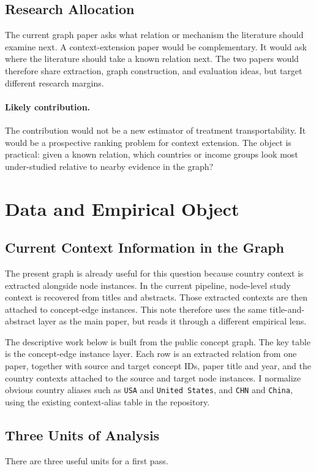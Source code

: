 \documentclass[11pt]{article}
\begin{document}
\subsection{Research Allocation}
The current graph paper asks what relation or mechanism the literature should examine next. A context-extension paper would be complementary. It would ask where the literature should take a known relation next. The two papers would therefore share extraction, graph construction, and evaluation ideas, but target different research margins.

\paragraph{Likely contribution.}
The contribution would not be a new estimator of treatment transportability. It would be a prospective ranking problem for context extension. The object is practical: given a known relation, which countries or income groups look most under-studied relative to nearby evidence in the graph?

\section{Data and Empirical Object}
\subsection{Current Context Information in the Graph}
The present graph is already useful for this question because country context is extracted alongside node instances. In the current pipeline, node-level study context is recovered from titles and abstracts. Those extracted contexts are then attached to concept-edge instances. This note therefore uses the same title-and-abstract layer as the main paper, but reads it through a different empirical lens.

The descriptive work below is built from the public concept graph. The key table is the concept-edge instance layer. Each row is an extracted relation from one paper, together with source and target concept IDs, paper title and year, and the country contexts attached to the source and target node instances. I normalize obvious country aliases such as \texttt{USA} and \texttt{United States}, and \texttt{CHN} and \texttt{China}, using the existing context-alias table in the repository.

\subsection{Three Units of Analysis}
There are three useful units for a first pass.
\end{document}
